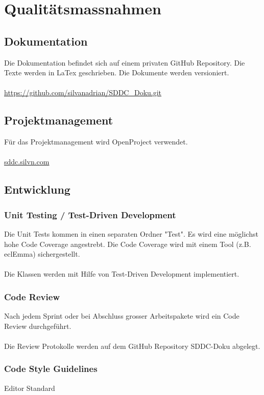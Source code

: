 \documentclass[11pt]{scrartcl}
\begin{document}
\section{Qualitätsmassnahmen}
\subsection{Dokumentation}
Die Dokumentation befindet sich auf einem privaten GitHub Repository.
Die Texte werden in LaTex geschrieben. Die Dokumente werden versioniert.\\
\\
\url{https://github.com/silvanadrian/SDDC_Doku.git}

\subsection{Projektmanagement}
Für das Projektmanagement wird OpenProject verwendet.\\
\\
\url{sddc.silvn.com}


\subsection{Entwicklung}
\subsubsection{Unit Testing / Test-Driven Development}
Die Unit Tests kommen in einen separaten Ordner "Test".
Es wird eine möglichst hohe Code Coverage angestrebt.
Die Code Coverage wird mit einem Tool (z.B. eclEmma) sichergestellt.\\
\\
Die Klassen werden mit Hilfe von Test-Driven Development implementiert.

\subsubsection{Code Review}
Nach jedem Sprint oder bei Abschluss grosser Arbeitspakete wird ein Code Review durchgeführt.\\
\\
Die Review Protokolle werden auf dem GitHub Repository SDDC-Doku abgelegt.

\subsubsection{Code Style Guidelines}
Editor Standard
\end{document}
